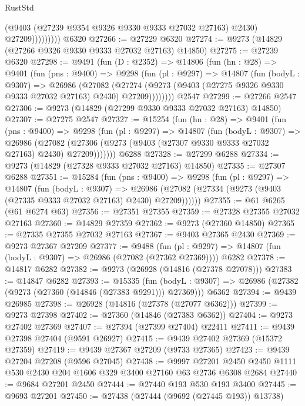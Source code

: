 \begin{lexlean}{RustStd}
\begin{coremodule}
{\begin{coremodule}
{{{{{{{{{{{{{{{{{{{{{{{{{{{{{{{{{{{{{{{{{{{{{{{{{{{{{{{                      (@9403 (@27239 @9354 @9326 @9330 @9333 @27032 @27163) @2430)
                      @27209)))))))))
    @6320
@27266 := @27229 @6320
@27274 := @9273 (@14829 (@27266 @9326 @9330 @9333 @27032 @27163) @14850)
@27275 := @27239 @6320
@27298 := @9491
    (fun (D : @2352) =>
    @14806
      (fun (hn : @28) =>
      @9401
        (fun (pns : @9400) =>
        @9298
          (fun (pl : @9297) =>
          @14807
            (fun (bodyL : @9307) =>
            @26986
              (@27082
                (@27274 (@9273 (@9403 (@27275 @9326 @9330 @9333 @27032 @27163) @2430) @27209))))))))
    @2547
@27299 := @27266 @2547
@27306 := @9273 (@14829 (@27299 @9330 @9333 @27032 @27163) @14850)
@27307 := @27275 @2547
@27327 := @15254
    (fun (hn : @28) =>
    @9401
      (fun (pns : @9400) =>
      @9298
        (fun (pl : @9297) =>
        @14807
          (fun (bodyL : @9307) =>
          @26986
            (@27082 (@27306 (@9273 (@9403 (@27307 @9330 @9333 @27032 @27163) @2430) @27209)))))))
    @6288
@27328 := @27299 @6288
@27334 := @9273 (@14829 (@27328 @9333 @27032 @27163) @14850)
@27335 := @27307 @6288
@27351 := @15284
    (fun (pns : @9400) =>
    @9298
      (fun (pl : @9297) =>
      @14807
        (fun (bodyL : @9307) =>
        @26986 (@27082 (@27334 (@9273 (@9403 (@27335 @9333 @27032 @27163) @2430) @27209))))))
@27355 := @61 @6265 (@61 @6274 @63)
@27356 := @27351 @27355
@27359 := @27328 @27355 @27032 @27163
@27360 := @14829 @27359
@27362 := @9273 (@27360 @14850)
@27365 := @27335 @27355 @27032 @27163
@27367 := @9403 @27365 @2430
@27369 := @9273 @27367 @27209
@27377 := @9488
    (fun (pl : @9297) => @14807 (fun (bodyL : @9307) => @26986 (@27082 (@27362 @27369))))
    @6282
@27378 := @14817 @6282
@27382 := @9273 (@26928 (@14816 (@27378 @27078)))
@27383 := @14847 @6282
@27393 := @15335
    (fun (bodyL : @9307) => @26986 (@27382 (@9273 (@27360 (@14846 (@27383 @9291))) @27369)))
    @6362
@27394 := @9439 @26985
@27398 := @26928 (@14816 (@27378 (@27077 @6362)))
@27399 := @9273 @27398
@27402 := @27360 (@14846 (@27383 @6362))
@27404 := @9273 @27402 @27369
@27407 := @27394 (@27399 @27404) @22411
@27411 := @9439 @27398 @27404 (@9591 @26927)
@27415 := @9439 @27402 @27369 (@15372 @27359)
@27419 := @9439 @27367 @27209 (@9733 @27365)
@27423 := @9439 @27204 @27208 (@9596 @27045)
@27438 := @9997
    @27201
    @2450
    @2450
    @1111
    @530
    @2430
    @204
    @1606
    @329
    @3400
    @27160
    @63
    @2736
    @6308
    @2684
@27440 := @9684 @27201 @2450
@27444 := @27440 @193 @530 @193 @3400
@27445 := @9693 @27201
@27450 := @27438 (@27444 (@9692 (@27445 @193)) @13738)
}}}}}}}}}}}}}}}}}}}}}}}}}}}}}}}}}}}}}}}}}}}}}}}}}}}}}}}
\end{coremodule}}
\end{coremodule}
\end{lexlean}
